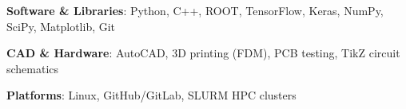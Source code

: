 \documentclass[margin,line]{resume}
\let\origsection\section%
\let\section\subsection%
\let\section\origsection%
\begin{document}
\begin{resume}
\textbf{Software \& Libraries}: Python, C++, ROOT, TensorFlow, Keras, NumPy, SciPy, Matplotlib, Git

\textbf{CAD \& Hardware}: AutoCAD, 3D printing (FDM), PCB testing, TikZ circuit schematics

\textbf{Platforms}: Linux, GitHub/GitLab, SLURM HPC clusters



%
%
\end{resume}
\end{document}
